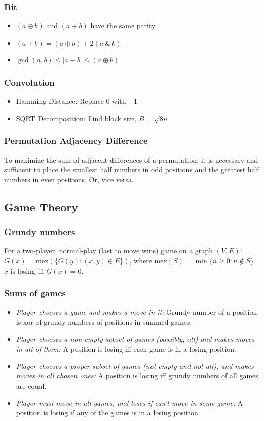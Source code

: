 \subsubsection{Bit}
\begin{itemize}
\item $(a \oplus b)$ and $(a + b)$ have the same parity
\item $(a + b) = (a \oplus b) + 2(a \ \& \ b)$
\item $\gcd(a, b) \le |a - b| \le (a \oplus b)$
\end{itemize}

\subsubsection{Convolution}
\begin{itemize}
\item Hamming Distance: Replace $ 0 $ with $ -1 $
\item SQRT Decomposition: Find block size, $B = \sqrt{8n}$
\end{itemize}

\subsubsection{Permutation Adjacency Difference}
To maximize the sum of adjacent differences of a permutation, it is necessary and sufficient to place the smallest half numbers in odd positions and the greatest half numbers in even positions. Or, vice versa.

\subsection{Game Theory}
\subsubsection{Grundy numbers}
For a two-player, normal-play (last to move wins) game on a graph $(V,E)$:
$G(x) = \mbox{mex}(\{ G(y) : (x, y) \in E \})$,
where $\mbox{mex}(S) = \min \{ n \ge 0: n \not\in S \}$.
$x$ is losing iff $G(x) = 0$.

\subsubsection{Sums of games}
\begin{itemize}
\item
  \emph{Player chooses a game and makes a move in it:}
  Grundy number of a position is xor of grundy numbers of positions in summed games.
\item
  \emph{Player chooses a non-empty subset of games (possibly, all) and makes moves in all of them:}
  A position is losing iff each game is in a losing position.
\item
  \emph{Player chooses a proper subset of games (not empty and not all), and makes moves in all chosen ones:}
  A position is losing iff grundy numbers of all games are equal.
\item
  \emph{Player must move in all games, and loses if can't move in some game:}
  A position is losing if any of the games is in a losing position.
\end{itemize}


